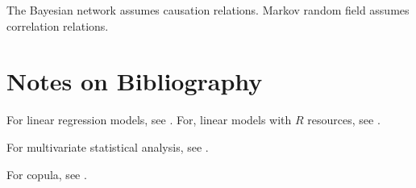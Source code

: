 \begin{refsection}
\begin{remark}
	The Bayesian network assumes causation relations. Markov random field assumes correlation relations.	
\end{remark}






\section{Notes on Bibliography}

For linear regression models, see \cite{kutner2003applied}\cite{seber2012linear}. For, linear models with $R$ resources, see \cite{faraway2014linear}.


For multivariate statistical analysis, see \cite{johnson2007applied}\cite{anderson2009introduction}.

For copula, see \cite{Ruschendorf2013mathematical}\cite{lindskog2000modelling}\cite{mcneil2015quantitative}\cite{cherubini2004copula}.

\printbibliography
\end{refsection}
